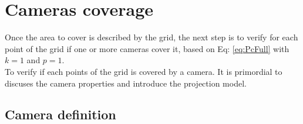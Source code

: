 \section{Cameras coverage}\label{sec:CamerasCoverage}


Once the area to cover is described by the grid, the next step is to verify for each point of the grid if one or more cameras cover it, based on Eq: \ref{eq:PcFull} with $k=1$ and $p=1$.\\
To verify if each points of the grid is covered by a camera. It is primordial to discuses the camera properties and introduce the projection model.

\subsection{Camera definition}\label{sec:CamerasDefinition}

